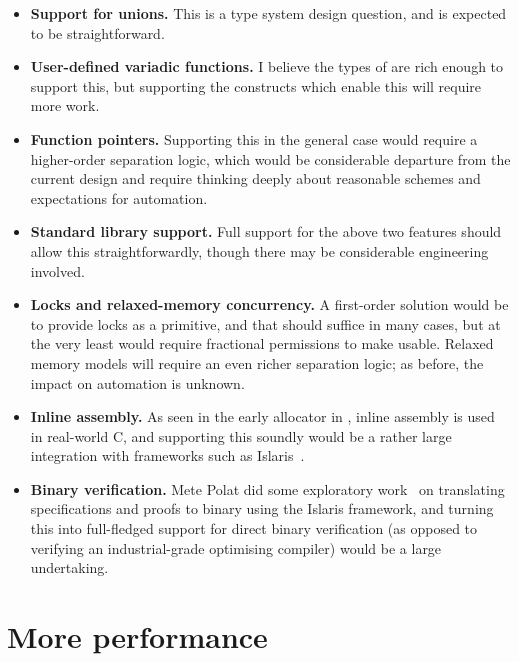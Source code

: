 \begin{itemize}
    \item \textbf{Support for unions.} This is a type system design
        question, and is expected to be straightforward.
    \item \textbf{User-defined variadic functions.} I believe the types of
         are rich enough to support this, but supporting the
         constructs which enable this will require more work.
    \item \textbf{Function pointers.} Supporting this in the general
        case would require a higher-order separation logic, which would
        be considerable departure from the current design and require
        thinking deeply about reasonable schemes and expectations for
        automation.
    \item \textbf{Standard library support.} Full support for the above 
        two features should allow this straightforwardly, though
        there may be considerable engineering involved.
    \item \textbf{Locks and relaxed-memory concurrency.} A first-order solution
        would be to provide locks as a primitive, and that should suffice in
        many cases, but at the very least would require fractional permissions
        to make usable. Relaxed memory models will require an even richer
        separation logic; as before, the impact on automation is unknown.
    \item \textbf{Inline assembly.} As seen in the early allocator in
        , inline assembly is used in real-world C, and supporting
        this soundly would be a rather large integration with frameworks
        such as Islaris~.
    \item \textbf{Binary verification.} Mete Polat did some exploratory
        work~ on translating 
        specifications and proofs to binary using the
        Islaris framework, and turning this into full-fledged support
        for direct binary verification (as opposed to verifying an
        industrial-grade optimising compiler) would be a large undertaking.
\end{itemize}

\section{More performance}

